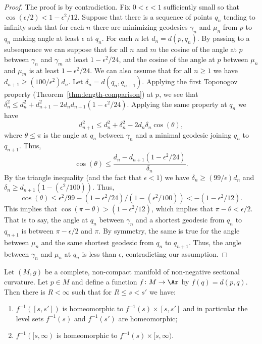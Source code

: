 \begin{proof}
The proof is by contradiction. Fix $0<\epsilon<1$ sufficiently small
so that $\cos(\epsilon/2)<1-\epsilon^2/12$. Suppose that there
is a sequence of points $q_n$ tending to infinity such that for each
$n$ there are minimizing geodesics $\gamma_n$ and $\mu_n$ from $p$
to $q_n$ making angle at least $\epsilon$ at $q_n$. For each $n$ let
$d_n=d(p,q_n)$. By passing to a subsequence we can suppose that for
all $n$ and $m$ the cosine of the angle at $p$ between $\gamma_n$
and $\gamma_m$ at least $1-\epsilon^2/24$, and the cosine of the
angle at $p$ between $\mu_n$ and $\mu_m$ is at least
$1-\epsilon^2/24$. We can also assume that for all $n\ge 1$ we have
$d_{n+1}\ge (100/\epsilon^2) d_n$. Let $\delta_n=d(q_n,q_{n+1})$.
Applying the first Toponogov property (Theorem~\ref{thm:length-comparison}) at $p$, we see that
$\delta_n^2\le d_n^2+d_{n+1}^2-2d_nd_{n+1}(1-\epsilon^2/24)$.
Applying the same property at $q_n$ we have
$$d_{n+1}^2\le d_n^2+\delta_n^2-2d_n\delta_n\cos(\theta),$$ where
$\theta\le \pi$ is the angle at $q_n$ between $\gamma_n$ and a
minimal geodesic joining $q_n$ to $q_{n+1}$. Thus,
$$\cos(\theta)\le
\frac{d_n-d_{n+1}(1-\epsilon^2/24)}{\delta_n}.$$ By the triangle
inequality (and the fact that $\epsilon<1$) we have $\delta_n\ge
(99/\epsilon)d_n$ and $\delta_n\ge d_{n+1}(1-(\epsilon^2/100))$.
Thus,
$$\cos(\theta)\le
\epsilon^2/99-(1-\epsilon^2/24)/(1-(\epsilon^2/100))<-(1-\epsilon^2/12).$$
This implies that $\cos(\pi-\theta)>(1-\epsilon^2/12)$, which
implies that $\pi-\theta<\epsilon/2$. That is to say, the angle at
$q_n$ between $\gamma_n$ and a shortest geodesic from $q_n$ to
$q_{n+1}$ is between $\pi-\epsilon/2$ and $\pi$. By symmetry, the
same is true for the angle between $\mu_n$ and the same shortest
geodesic from $q_n$ to $q_{n+1}$. Thus, the angle between $\gamma_n$
and $\mu_n$ at $q_n$ is less than $\epsilon$, contradicting our
assumption.
\end{proof}




\begin{corollary}
\label{cor:distance-level-sets-homeomorphic}
\label{homeo}
Let $(M,g)$ be a complete, non-compact manifold of non-negative
sectional curvature. Let $p\in M$ and define a function $f\colon
M\to \Ar$ by $f(q)=d(p,q)$. Then there is $R<\infty$ such that for
$R\le s<s'$ we have:
\begin{enumerate}
\item $f^{-1}([s,s'])$ is homeomorphic to $f^{-1}(s)\times[s,s']$ and
in particular the level sets $f^{-1}(s)$ and $f^{-1}(s')$ are
homeomorphic; \item $f^{-1}([s,\infty)$ is homeomorphic to
$f^{-1}(s)\times[s,\infty)$.
\end{enumerate}
\end{corollary}

